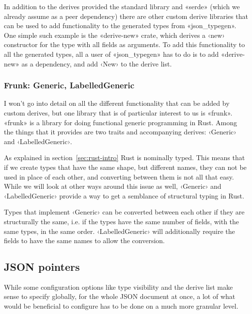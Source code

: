 In addition to the derives provided the standard library and «serde»  (which we already assume as a peer dependency) there are other custom derive libraries that can be used to add functionality to the generated types from «json_typegen». One simple such example is the «derive-new» crate, which derives a ‹new› constructor for the type with all fields as arguments. To add this functionality to all the generated types, all a user of «json_typegen» has to do is to add «derive-new» as a dependency, and add ‹New› to the derive list.

\subsubsection{Frunk: Generic, LabelledGeneric}

I won't go into detail on all the different functionality that can be added by custom derives, but one library that is of particular interest to us is «frunk». «frunk» is a library for doing functional generic programming in Rust. Among the things that it provides are two traits and accompanying derives: ‹Generic› and ‹LabelledGeneric›.


As explained in section~\ref{sec:rust-intro} Rust is nominally typed. This means that if we create types that have the same shape, but different names, they can not be used in place of each other, and converting between them is not all that easy. While we will look at other ways around this issue as well, ‹Generic› and ‹LabelledGeneric› provide a way to get a semblance of structural typing in Rust.

Types that implement ‹Generic› can be converted between each other if they are structurally the same, i.e. if the types have the same number of fields, with the same types, in the same order. ‹LabelledGeneric› will additionally require the fields to have the same names to allow the conversion.

\subsection{JSON pointers}
\label{sec:json-pointers}

While some configuration options like type visibility and the derive list make sense to specify globally, for the whole JSON document at once, a lot of what would be beneficial to configure has to be done on a much more granular level.

